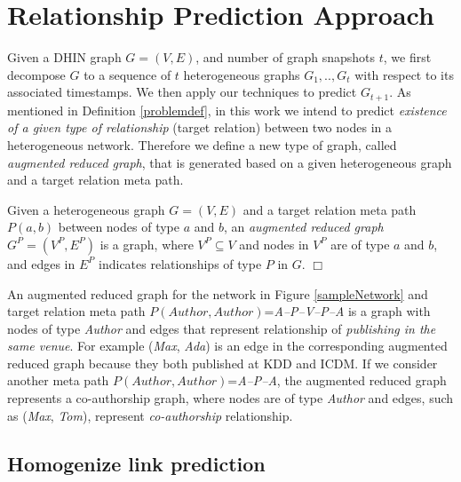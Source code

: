 \section{Relationship Prediction Approach}

Given a DHIN graph $G=(V,E)$, and number of graph snapshots $t$, we first decompose $G$ to a sequence of $t$ heterogeneous graphs ${G_1, .., G_t}$ with respect to its associated timestamps. We then apply our techniques to predict $G_{t+1}$. As mentioned in Definition \ref{problemdef}, in this work we intend to predict \textit{existence of a given type of relationship} (target relation) between two nodes in a heterogeneous network. Therefore we define a new type of graph, called \textit{augmented reduced graph}, that is generated based on a given heterogeneous graph and a target relation meta path. 

\begin{definition}\label{def:ARG}
Given a heterogeneous graph $G=(V,E)$ and a target relation meta path $P(a,b)$ between nodes of type $a$ and $b$, an \textit{augmented reduced graph} $G^P=(V^P,E^P)$ is a graph, where $V^P \subseteq V$ and nodes in $V^P$ are of type $a$ and $b$, and edges in $E^P$ indicates relationships of type $P$ in $G$. $\Box$
\end{definition}

An augmented reduced graph for the network in Figure \ref{sampleNetwork} and target relation meta path $P(Author,Author)$=\textit{A--P--V--P--A} is a graph with nodes of type \textit{Author} and edges that represent relationship of \textit{publishing in the same venue}. For example (\textit{Max}, \textit{Ada}) is an edge in the corresponding augmented reduced graph because they both published at KDD and ICDM. If we consider another meta path $P(Author,Author)$=\textit{A--P--A}, the augmented reduced graph represents a co-authorship graph, where nodes are of type \textit{Author} and edges, such as (\textit{Max}, \textit{Tom}), represent \textit{co-authorship} relationship.  



\subsection{Homogenize link prediction}

